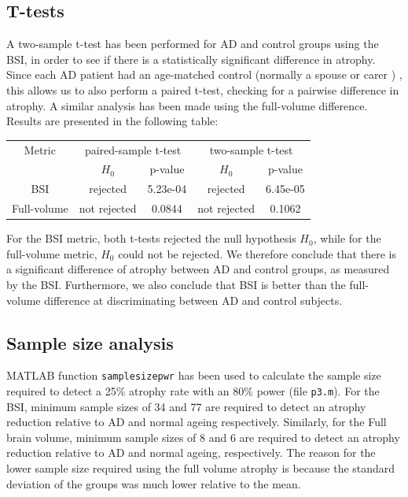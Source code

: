 \documentclass[11pt,a4paper,oneside]{report}
\begin{document}
\subsection*{T-tests}

A two-sample t-test has been performed for AD and control groups using the BSI, in order to see if there is a statistically significant difference in atrophy. Since each AD patient had an age-matched control (normally a spouse or carer ) \cite{malone2013miriad}, this allows us to also perform a paired t-test, checking for a pairwise difference in atrophy. A similar analysis has been made using the full-volume difference. Results are presented in the following table:\\

\begin{center}
 \begin{tabular}{c | c | c | c | c}
 Metric & \multicolumn{2}{c|}{paired-sample t-test} & \multicolumn{2}{c}{two-sample t-test}\\  
 & $H_0$ & p-value & $H_0$ & p-value\\
 \hline
 BSI & \cellcolor{green!15} rejected & 5.23e-04& \cellcolor{green!15}rejected & 6.45e-05\\
 Full-volume & \cellcolor{red!15} not rejected & 0.0844 & \cellcolor{red!15} not rejected & 0.1062\\
 
 \end{tabular}
\end{center}

For the BSI metric, both t-tests rejected the null hypothesis $H_0$, while for the full-volume metric, $H_0$ could not be rejected. We therefore conclude that there is a significant difference of atrophy between AD and control groups, as measured by the BSI. Furthermore, we also conclude that BSI is better than the full-volume difference at discriminating between AD and control subjects. 

\subsection*{Sample size analysis}

MATLAB function \texttt{samplesizepwr} has been used to calculate the sample size required to detect a 25\% atrophy rate with an 80\% power (file \texttt{p3.m}). For the BSI, minimum sample sizes of 34 and 77 are required to detect an atrophy reduction relative to AD and normal ageing respectively. Similarly, for the Full brain volume, minimum sample sizes of 8 and 6 are required to detect an atrophy reduction relative to AD and normal ageing, respectively. The reason for the lower sample size required using the full volume atrophy is because the standard deviation of the groups was much lower relative to the mean.
\end{document}
